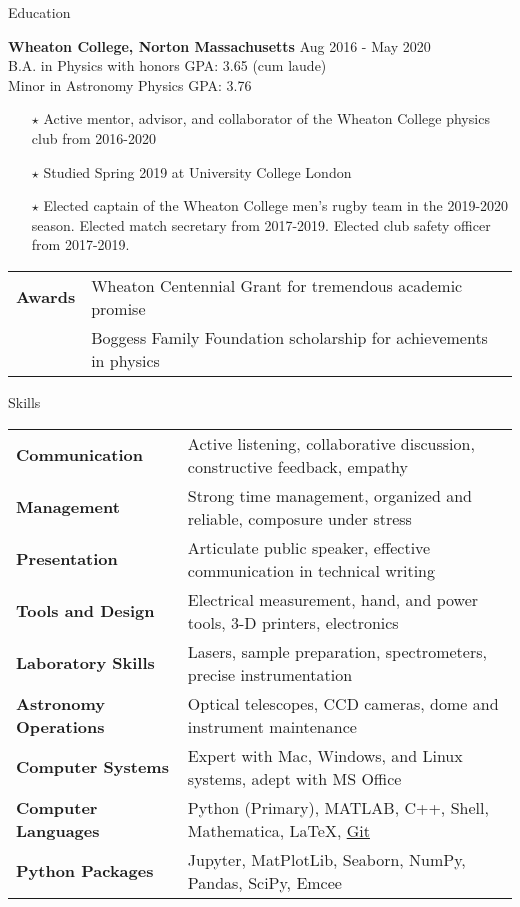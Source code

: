 \documentclass{resume} %
\begin{document}
\begin{rSection}{Education}

{\bf Wheaton College, Norton Massachusetts} \hfill {Aug 2016 - May 2020} \\
 B.A. in Physics with honors \hfill {GPA: 3.65 (cum laude)}
\\ Minor in Astronomy \hfill {Physics GPA: 3.76}
\begin{itemize}\itemsep -6pt
 \item[$\star$] Active mentor, advisor, and collaborator of the Wheaton College physics club from 2016-2020
 \item[$\star$] Studied Spring 2019 at University College London
 \item[$\star$] Elected captain of the Wheaton College men's rugby team in the 2019-2020 season. Elected match secretary from 2017-2019. Elected club safety officer from 2017-2019.
\end{itemize}
\begin{tabular}{ @{} >{\hspace{5mm}\bfseries}l @{\hspace{2ex}} l }
Awards & Wheaton Centennial Grant for tremendous academic promise\\
& Boggess Family Foundation scholarship for achievements in physics
\end{tabular}
\end{rSection}

\begin{rSection}{Skills}
\begin{tabular}{ @{} >{\bfseries}l @{\hspace{2ex}} l }
Communication & Active listening, collaborative discussion, constructive feedback, empathy\\
Management & Strong time management, organized and reliable, composure under stress\\
Presentation & Articulate public speaker, effective communication in technical writing \\
Tools and Design & Electrical measurement, hand, and power tools, 3-D printers, electronics\\
Laboratory Skills & Lasers, sample preparation, spectrometers, precise instrumentation\\
Astronomy Operations & Optical telescopes, CCD cameras, dome and instrument maintenance\\
Computer Systems & Expert with Mac, Windows, and Linux systems, adept with MS Office\\
Computer Languages &  Python (Primary), MATLAB, C++, Shell, Mathematica, \LaTeX, \href{https://github.com/seanmacb}{Git}\\
Python Packages & Jupyter, MatPlotLib, Seaborn, NumPy, Pandas, SciPy, Emcee\\  


\end{tabular}
\end{rSection}
\end{document}
